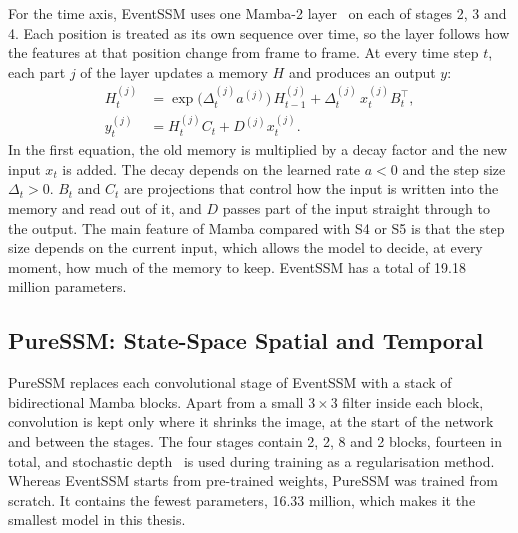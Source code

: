\documentclass[11pt, a4paper]{report}
\begin{document}
For the time axis, EventSSM uses one Mamba-2 layer~\cite{dao2024transformers} on each of stages 2, 3 and 4.
Each position is treated as its own sequence over time, so the layer follows how the features at that
position change from frame to frame. At every time step $t$, each part $j$ of the layer updates a memory $H$
and produces an output $y$:
\begin{align}
  H^{(j)}_t &= \exp\!\big(\Delta^{(j)}_t a^{(j)}\big)\, H^{(j)}_{t-1} + \Delta^{(j)}_t\, x^{(j)}_t B_t^{\top},
  \label{eq:mamba2_state}\\
  y^{(j)}_t &= H^{(j)}_t C_t + D^{(j)} x^{(j)}_t.
  \label{eq:mamba2_out}
\end{align}
In the first equation, the old memory is multiplied by a decay factor and the new input $x_t$ is added. The
decay depends on the learned rate $a<0$ and the step size $\Delta_t>0$. $B_t$ and $C_t$ are projections
that control how the input is written into the memory and read out of it, and $D$ passes part of the input
straight through to the output. The main feature of Mamba compared with S4 or S5 is that the step size
depends on the current input, which allows the model to decide, at every moment, how much of the memory to
keep. EventSSM has a total of 19.18 million parameters.

\subsection{PureSSM: State-Space Spatial and Temporal}
\label{subsec:puressm}
PureSSM replaces each convolutional stage of EventSSM with a stack of bidirectional Mamba blocks.
Apart from a small $3\times3$ filter inside each block, convolution is kept only where it shrinks the image, at the start of the network and between the stages.
The four stages contain 2, 2, 8 and 2 blocks, fourteen in total, and stochastic
depth~\cite{huang2016deep} is used during training as a regularisation method. Whereas EventSSM starts
from pre-trained weights, PureSSM was trained from scratch. It contains the fewest parameters, 16.33
million, which makes it the smallest model in this thesis.
\end{document}
